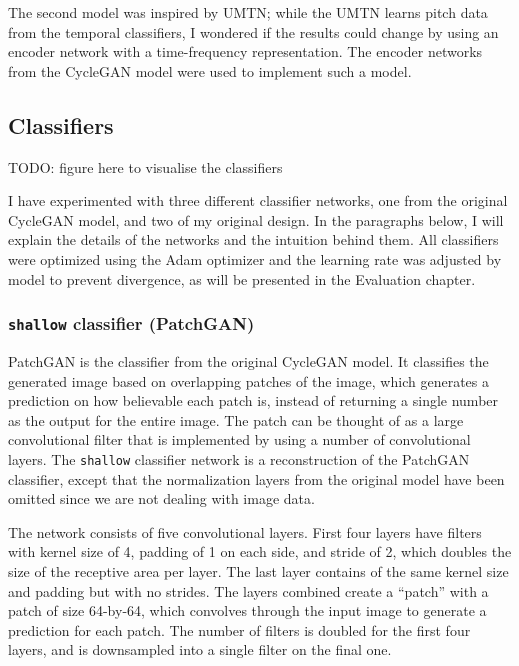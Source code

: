 \documentclass[12pt,a4paper,]{report}
\begin{document}
The second model was inspired by UMTN; while the UMTN learns pitch data
from the temporal classifiers, I wondered if the results could change by
using an encoder network with a time-frequency representation. The
encoder networks from the CycleGAN model were used to implement such a
model.

\hypertarget{classifiers}{%
\subsection{Classifiers}\label{classifiers}}

TODO: figure here to visualise the classifiers

I have experimented with three different classifier networks, one from
the original CycleGAN model, and two of my original design. In the
paragraphs below, I will explain the details of the networks and the
intuition behind them. All classifiers were optimized using the Adam
optimizer and the learning rate was adjusted by model to prevent
divergence, as will be presented in the Evaluation chapter.

\hypertarget{shallow-classifier-patchgan}{%
\subsubsection{\texorpdfstring{\texttt{shallow} classifier
(PatchGAN)}{shallow classifier (PatchGAN)}}\label{shallow-classifier-patchgan}}

PatchGAN is the classifier from the original CycleGAN model. It
classifies the generated image based on overlapping patches of the
image, which generates a prediction on how believable each patch is,
instead of returning a single number as the output for the entire image.
The patch can be thought of as a large convolutional filter that is
implemented by using a number of convolutional layers. The
\texttt{shallow} classifier network is a reconstruction of the PatchGAN
classifier, except that the normalization layers from the original model
have been omitted since we are not dealing with image data.

The network consists of five convolutional layers. First four layers
have filters with kernel size of 4, padding of 1 on each side, and
stride of 2, which doubles the size of the receptive area per layer. The
last layer contains of the same kernel size and padding but with no
strides. The layers combined create a ``patch'' with a patch of size
64-by-64, which convolves through the input image to generate a
prediction for each patch. The number of filters is doubled for the
first four layers, and is downsampled into a single filter on the final
one.
\end{document}
